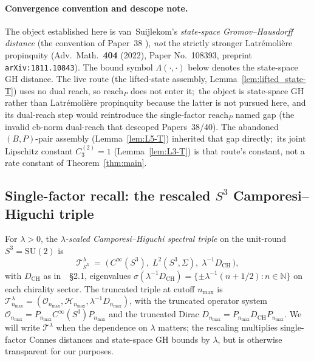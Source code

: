 \documentclass[11pt,a4paper]{article}
\theoremstyle{plain}
\theoremstyle{definition}
\newcommand{\nmax}{n_{\max}}
\newcommand{\sthree}{S^{3}}
\newcommand{\Hilb}{\mathcal{H}}
\newcommand{\Op}{\mathcal{O}}
\newcommand{\Tcal}{\mathcal{T}}
\newcommand{\N}{\mathbb{N}}
\newcommand{\SU}{\mathrm{SU}}
\newcommand{\DCH}{D_{\mathrm{CH}}}
\begin{document}
\paragraph{Convergence convention and descope note.}
The object established here is van~Suijlekom's \emph{state-space
Gromov--Hausdorff distance} (the convention of Paper~38
\cite{loutey_paper38}), \emph{not} the strictly stronger
Latr\'emoli\`ere propinquity \cite{latremoliere_metric_st_2017}
(Adv.~Math.\ \textbf{404} (2022), Paper No.~108393, preprint
\texttt{arXiv:1811.10843}). The bound symbol $\Lambda(\cdot, \cdot)$
below denotes the state-space GH distance. The live route
(the lifted-state assembly, Lemma~\ref{lem:lifted_state-T}) uses no dual
reach, so $\mathrm{reach}_P$ does not enter it;\ the object is state-space
GH rather than Latr\'emoli\`ere propinquity because the latter is not
pursued here, and its dual-reach step would reintroduce the single-factor
$\mathrm{reach}_P$ named gap (the invalid cb-norm dual-reach that descoped
Papers~38/40). The abandoned $(B,P)$-pair assembly (Lemma~\ref{lem:L5-T})
inherited that gap directly;\ its joint Lipschitz constant
$C_3^{(2)} = 1$ (Lemma~\ref{lem:L3-T}) is that route's constant,
not a rate constant of Theorem~\ref{thm:main}.

\subsection{Single-factor recall: the rescaled $\sthree$ Camporesi--Higuchi triple}
\label{sec:single_factor_recall}

For $\lambda > 0$, the \emph{$\lambda$-scaled Camporesi--Higuchi
spectral triple} on the unit-round $\sthree = \SU(2)$ is
\begin{equation}\label{eq:single_factor_triple}
   \Tcal_{\sthree}^{\lambda}
   \;=\; \bigl(\, C^\infty(\sthree),\; L^2(\sthree, \Sigma),\;
   \lambda^{-1}\DCH \,\bigr),
\end{equation}
with $\DCH$ as in~\cite{loutey_paper38}~\S 2.1, eigenvalues
$\sigma(\lambda^{-1}\DCH) = \{\pm \lambda^{-1}(n + 1/2) : n \in \N\}$ on
each chirality sector. The truncated triple at cutoff $\nmax$ is
$\Tcal_{\nmax}^{\lambda} = (\Op_{\nmax}, \Hilb_{\nmax},
\lambda^{-1} D_{\nmax})$, with the truncated operator system
$\Op_{\nmax} = P_{\nmax} C^\infty(\sthree) P_{\nmax}$ and the truncated
Dirac $D_{\nmax} = P_{\nmax} \DCH P_{\nmax}$. We will write
$\Tcal^\lambda$ when the dependence on $\lambda$ matters; the rescaling
multiplies single-factor Connes distances and state-space GH bounds by
$\lambda$, but is otherwise transparent for our purposes.
\end{document}
